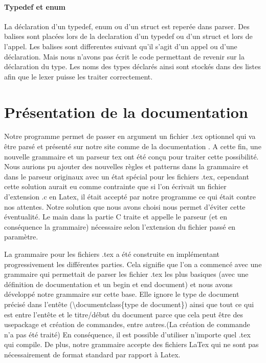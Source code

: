\documentclass{report}
\begin{document}
{{		\subsubsection{Typedef et enum}{
			La déclaration d'un typedef, enum ou d'un struct est reperée dans parser. Des balises sont placées lors de la declaration d'un typedef ou d'un struct et lors de l'appel. Les balises 
			sont differentes suivant qu'il s'agit d'un appel ou d'une déclaration. Mais nous n'avons pas écrit le code permettant de revenir sur la déclaration du type.
			Les noms des types déclarés ainsi sont stockés dans des listes afin que le lexer puisse les traiter correctement.
				
			}
			}
}
\chapter{Présentation de la documentation}
Notre programme permet de passer en argument un fichier .tex optionnel qui va être parsé et présenté sur notre site comme de la documentation .
A cette fin, une nouvelle grammaire et un parseur tex ont été conçu pour traiter cette possibilité. Nous aurions pu ajouter des nouvelles règles et patterns dans la grammaire et dans le parseur originaux avec un état spécial pour les fichiers .tex, cependant cette solution aurait eu comme contrainte que si l'on écrivait un fichier d'extension .c en  Latex, il était accepté par notre programme ce qui était contre nos attentes. Notre solution que nous avons choisi nous permet d'éviter cette éventualité. Le main dans la partie C traite et appelle le parseur (et en conséquence la grammaire) nécessaire selon l'extension du fichier passé en paramètre.

La grammaire pour les fichiers .tex a été construite en implémentant progressivement les différentes parties.
Cela signifie que l'on a commencé avec une grammaire qui permettait de parser les fichier .tex les plus basiques (avec une définition de documentation et un begin et end document) et nous avons développé notre grammaire sur cette base. Elle ignore le type de document précisé dans l'entête (\textbackslash documentclass\{type de document\}) ainsi que tout ce qui est entre l'entête et le titre/début du document parce que cela peut être des usepackage et création de commandes, entre autres.(La création de commande n'a pas été traité)
En conséquence, il est possible d'utiliser n'importe quel .tex qui compile. De plus, notre grammaire accepte des fichiers LaTex qui ne sont pas nécessairement de format standard par rapport à Latex.
\end{document}

